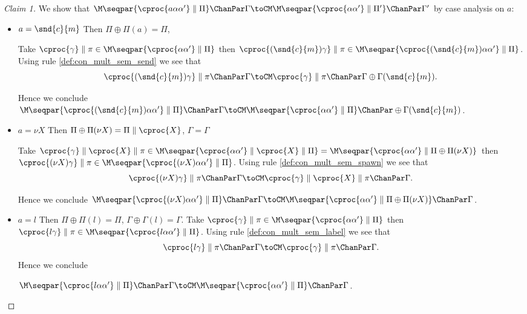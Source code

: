 \begin{proof}[Claim 1]
We show that 
$\M\seqpar{\cproc{a\alpha\alpha'} \parallel \Pi} \ChanPar \Gamma \toCM 
  \M\seqpar{\cproc{\alpha\alpha'} \parallel \Pi'} \ChanPar \Gamma' $
by case analysis on $a$:
\begin{itemize}
\item $a = \snd{c}{m}$ \newline
	Then $\Pi \oplus \Pi(a) = \Pi$, 

	Take $\cproc{\gamma} \parallel \pi \in \M\seqpar{\cproc{\alpha\alpha'} \parallel \Pi}$ then 
	$\cproc{(\snd{c}{m})\gamma} \parallel \pi \in \M\seqpar{\cproc{(\snd{c}{m})\alpha\alpha'} \parallel \Pi}$. 
	Using rule \ref{def:con_mult_sem_send} we see that 
	$${\cproc{(\snd{c}{m})\gamma} \parallel \pi \ChanPar \Gamma \toCM \cproc{\gamma} \parallel \pi \ChanPar \Gamma \oplus \Gamma(\snd{c}{m})}.$$
	
	Hence we conclude 
	${\M\seqpar{\cproc{(\snd{c}{m})\alpha\alpha'} \parallel \Pi} \ChanPar \Gamma \toCM 
	     \M\seqpar{\cproc{\alpha\alpha'} \parallel \Pi} \ChanPar \oplus \Gamma(\snd{c}{m})}$.
	\item $a = \nu X$ \newline
	Then $\Pi \oplus \Pi(\nu X) = \Pi \parallel \cproc{X}$, 
	     $\Gamma = \Gamma$

	Take $\cproc{\gamma} \parallel \cproc{X} \parallel \pi \in \M\seqpar{\cproc{\alpha\alpha'} \parallel \cproc{X} \parallel\Pi} = \M\seqpar{\cproc{\alpha\alpha'} \parallel \Pi \oplus \Pi(\nu X)}$ then
	$\cproc{(\nu X)\gamma} \parallel \pi \in \M\seqpar{\cproc{(\nu X)\alpha\alpha'} \parallel \Pi}$.
	Using rule \ref{def:con_mult_sem_spawn} we see that 
	$${\cproc{(\nu X)\gamma} \parallel \pi \ChanPar \Gamma \toCM \cproc{\gamma} \parallel \cproc{X} \parallel \pi \ChanPar \Gamma}.$$ 
	
	Hence we conclude 
	${\M\seqpar{\cproc{(\nu X)\alpha\alpha'} \parallel \Pi} \ChanPar \Gamma \toCM 
	     \M\seqpar{\cproc{\alpha\alpha'} \parallel \Pi \oplus \Pi(\nu X)} \ChanPar \Gamma}$.
	\item $a = l$ \newline
	Then $\Pi    \oplus \Pi(l)    = \Pi$, 
	     $\Gamma \oplus \Gamma(l) = \Gamma$.
	Take $\cproc{\gamma} \parallel \pi \in \M\seqpar{\cproc{\alpha\alpha'} \parallel\Pi}$ then
	$\cproc{l\gamma} \parallel \pi \in \M\seqpar{\cproc{l\alpha\alpha'} \parallel \Pi}$. 
	Using rule \ref{def:con_mult_sem_label} we see that 
	$${\cproc{l\gamma} \parallel \pi \ChanPar \Gamma \toCM \cproc{\gamma} \parallel \pi \ChanPar \Gamma}.$$ 
	Hence we conclude 

	${\M\seqpar{\cproc{l\alpha\alpha'} \parallel \Pi} \ChanPar \Gamma \toCM 
	     \M\seqpar{\cproc{\alpha\alpha'} \parallel \Pi} \ChanPar \Gamma}$.
\end{itemize}
\end{proof}
